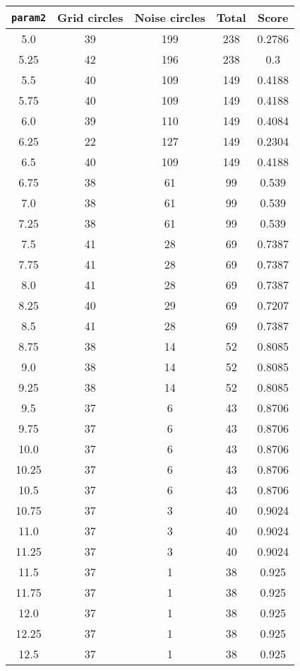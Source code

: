 \documentclass[letterpaper, 12pt]{article}
\begin{document}
\begin{longtable}{|c|c|c|c|c|}
\hline
\textbf{\texttt{param2}} & \textbf{Grid circles} & \textbf{Noise circles} & \textbf{Total} & \textbf{Score} \\
\hline
5.0 & 39 & 199 & 238 & 0.2786 \\
\hline
5.25 & 42 & 196 & 238 & 0.3 \\
\hline
5.5 & 40 & 109 & 149 & 0.4188 \\
\hline
5.75 & 40 & 109 & 149 & 0.4188 \\
\hline
6.0 & 39 & 110 & 149 & 0.4084 \\
\hline
6.25 & 22 & 127 & 149 & 0.2304 \\
\hline
6.5 & 40 & 109 & 149 & 0.4188 \\
\hline
6.75 & 38 & 61 & 99 & 0.539 \\
\hline
7.0 & 38 & 61 & 99 & 0.539 \\
\hline
7.25 & 38 & 61 & 99 & 0.539 \\
\hline
7.5 & 41 & 28 & 69 & 0.7387 \\
\hline
7.75 & 41 & 28 & 69 & 0.7387 \\
\hline
8.0 & 41 & 28 & 69 & 0.7387 \\
\hline
8.25 & 40 & 29 & 69 & 0.7207 \\
\hline
8.5 & 41 & 28 & 69 & 0.7387 \\
\hline
8.75 & 38 & 14 & 52 & 0.8085 \\
\hline
9.0 & 38 & 14 & 52 & 0.8085 \\
\hline
9.25 & 38 & 14 & 52 & 0.8085 \\
\hline
9.5 & 37 & 6 & 43 & 0.8706 \\
\hline
9.75 & 37 & 6 & 43 & 0.8706 \\
\hline
10.0 & 37 & 6 & 43 & 0.8706 \\
\hline
10.25 & 37 & 6 & 43 & 0.8706 \\
\hline
10.5 & 37 & 6 & 43 & 0.8706 \\
\hline
10.75 & 37 & 3 & 40 & 0.9024 \\
\hline
11.0 & 37 & 3 & 40 & 0.9024 \\
\hline
11.25 & 37 & 3 & 40 & 0.9024 \\
\hline
11.5 & 37 & 1 & 38 & 0.925 \\
\hline
11.75 & 37 & 1 & 38 & 0.925 \\
\hline
12.0 & 37 & 1 & 38 & 0.925 \\
\hline
12.25 & 37 & 1 & 38 & 0.925 \\
\hline
12.5 & 37 & 1 & 38 & 0.925 \\

\end{longtable}
\end{document}
